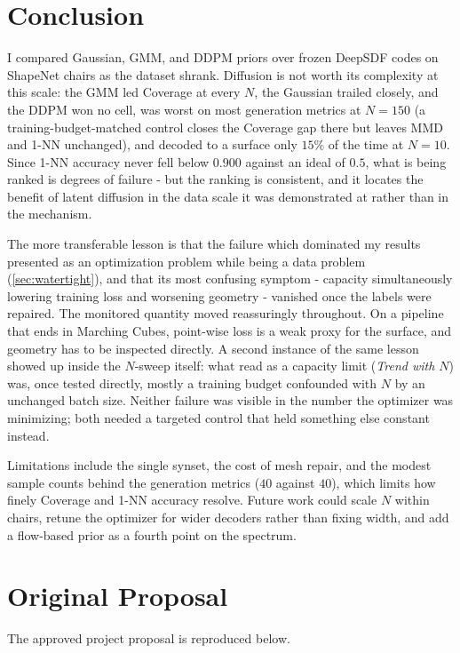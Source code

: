 \documentclass[11pt]{article}
\begin{document}
\section{Conclusion}
I compared Gaussian, GMM, and DDPM priors over frozen DeepSDF codes on ShapeNet
chairs as the dataset shrank. Diffusion is not worth its complexity at this
scale: the GMM led Coverage at every $N$, the Gaussian trailed closely, and the
DDPM won no cell, was worst on most generation metrics at $N=150$ (a
training-budget-matched control closes the Coverage gap there but leaves MMD
and 1-NN unchanged), and decoded to
a surface only $15\%$ of the time at $N=10$. Since 1-NN accuracy never fell below
$0.900$ against an ideal of $0.5$, what is being ranked is degrees of failure -
but the ranking is consistent, and it locates the benefit of latent diffusion in
the data scale it was demonstrated at rather than in the mechanism.

The more transferable lesson is that the failure which dominated my results
presented as an optimization problem while being a data problem
(\cref{sec:watertight}), and that its most confusing symptom - capacity
simultaneously lowering training loss and worsening geometry - vanished once
the labels were repaired. The monitored quantity moved reassuringly throughout.
On a pipeline that ends in Marching Cubes, point-wise loss is a weak proxy for
the surface, and geometry has to be inspected directly. A second instance of
the same lesson showed up inside the $N$-sweep itself: what read as a capacity
limit (\emph{Trend with $N$}) was, once tested directly, mostly a training
budget confounded with $N$ by an unchanged batch size. Neither failure was
visible in the number the optimizer was minimizing; both needed a targeted
control that held something else constant instead.

Limitations include the single synset, the cost of mesh repair, and the modest
sample counts behind the generation metrics ($40$ against $40$), which limits how
finely Coverage and 1-NN accuracy resolve. Future work could scale $N$ within
chairs, retune the optimizer for wider decoders rather than fixing width, and add
a flow-based prior as a fourth point on the spectrum.

\small
\setlength{\bibsep}{1pt}


\normalsize

\appendix
\onecolumn
\section{Original Proposal}
The approved project proposal is reproduced below.

\end{document}
